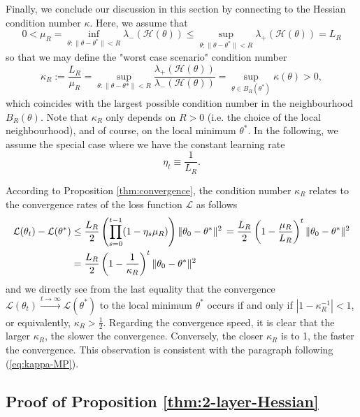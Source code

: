 \documentclass{article}
\begin{document}
\bigskip
\par
Finally, we conclude our discussion in this section by connecting to the Hessian condition number $\kappa$. Here, we assume that
\begin{equation}
0<\mu_R=\inf_{\theta:\|\theta-\theta^*\|< R}\lambda_-(\mathcal{H}(\theta))\leq\sup_{\theta:\|\theta-\theta^*\|< R}\lambda_+(\mathcal{H}(\theta))= L_R
\end{equation}
so that we may define the "worst case scenario" condition number
\begin{equation}
\kappa_R:=\frac{L_R}{\mu_R}=\sup_{\theta:\|\theta-\theta*\|<R}\frac{\lambda_+(\mathcal{H}(\theta))}{\lambda_-(\mathcal{H}(\theta))}=\sup_{\theta\in B_R(\theta^*)}\kappa(\theta)>0,
\end{equation}
which coincides with the largest possible condition number in the neighbourhood $B_R(\theta)$. Note that $\kappa_R$ only depends on $R>0$ (i.e. the choice of the local neighbourhood), and of course, on the local minimum $\theta^*$. In the following, we assume the special case where we have the constant learning rate
\begin{equation}
\eta_t\equiv\frac{1}{L_R}.
\end{equation}
\par
According to Proposition \ref{thm:convergence}, the condition number $\kappa_R$ relates to the convergence rates of the loss function $\mathcal{L}$ as follows
\begin{align}
\mathcal{L}(\theta_t)-\mathcal{L}(\theta^*) &\leq \frac{L_R}{2}\left(\prod_{s=0}^{t-1}(1-\eta_s\mu_R)\right)\|\theta_0-\theta^*\|^2 \,= \frac{L_R}{2}\left(1-\frac{\mu_R}{L_R}\right)^t\|\theta_0-\theta^*\|^2 \notag
\\ &=\frac{L_R}{2}\left(1-\frac{1}{\kappa_R}\right)^t\|\theta_0-\theta^*\|^2\label{}
\end{align}
and we directly see from the last equality that the convergence $\mathcal{L}(\theta_t)\stackrel{t\to\infty}{\to}\mathcal{L}(\theta^*)$ to the local minimum $\theta^*$ occurs if and only if $|1-\kappa_R^{-1}|<1$, or equivalently, $\kappa_R>\frac{1}{2}$. Regarding the convergence speed, it is clear that the larger $\kappa_R$, the slower the convergence. Conversely, the closer $\kappa_R$ is to 1, the faster the convergence. This observation is consistent with the paragraph following (\ref{eq:kappa-MP}).


\subsection{Proof of Proposition \ref{thm:2-layer-Hessian}} \label{sec:appendix_proof}
\setcounter{equation}{0}
\renewcommand{\theequation}{B.\arabic{equation}}
\end{document}
